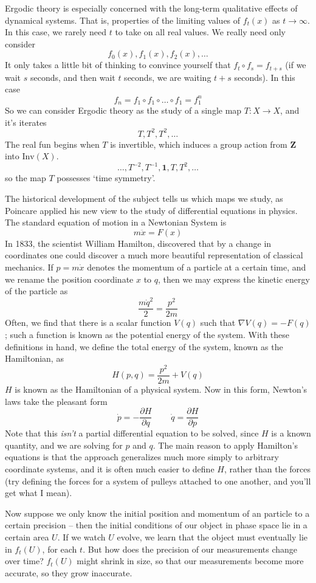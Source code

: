 Ergodic theory is especially concerned with the long-term qualitative effects of dynamical systems. That is, properties of the limiting values of $f_t(x)$ as $t \to \infty$. In this case, we rarely need $t$ to take on all real values. We really need only consider
%
\[ f_0(x), f_1(x), f_2(x), \dots \]
%
It only takes a little bit of thinking to convince yourself that $f_t \circ f_s = f_{t+s}$ (if we wait $s$ seconds, and then wait $t$ seconds, we are waiting $t + s$ seconds). In this case
%
\[ f_n = f_1 \circ f_1 \circ \dots \circ f_1 = f_1^n \]
%
So we can consider Ergodic theory as the study of a single map $T:X \to X$, and it's iterates
%
\[ T, T^2, T^2, \dots \]
%
The real fun begins when $T$ is invertible, which induces a group action from $\mathbf{Z}$ into $\text{Inv}(X)$.
%
\[ \dots, T^{-2}, T^{-1}, \mathbf{1}, T, T^2, \dots \]
%
so the map $T$ possesses `time symmetry'.

The historical development of the subject tells us which maps we study, as Poincare applied his new view to the study of differential equations in physics. The standard equation of motion in a Newtonian System is
%
\[ m \ddot{x} = F(x) \]
%
In 1833, the scientist William Hamilton, discovered that by a change in coordinates one could discover a much more beautiful representation of classical mechanics. If $p = m \dot{x}$ denotes the momentum of a particle at a certain time, and we rename the position coordinate $x$ to $q$, then we may express the kinetic energy of the particle as
%
\[ \frac{m\dot{q}^2}{2} = \frac{p^2}{2m} \]
%
Often, we find that there is a scalar function $V(q)$ such that $\nabla V(q) = - F(q)$; such a function is known as the potential energy of the system. With these definitions in hand, we define the total energy of the system, known as the Hamiltonian, as
%
\[ H(p,q) = \frac{p^2}{2m} + V(q) \]
%
$H$ is known as the Hamiltonian of a physical system. Now in this form, Newton's laws take the pleasant form
%
\[ \dot{p} = - \frac{\partial H}{\partial q}\ \ \ \ \ \ \ \ \ \ \dot{q} = \frac{\partial H}{\partial p} \]
%
Note that this {\it isn't} a partial differential equation to be solved, since $H$ is a known quantity, and we are solving for $p$ and $q$. The main reason to apply Hamilton's equations is that the approach generalizes much more simply to arbitrary coordinate systems, and it is often much easier to define $H$, rather than the forces (try defining the forces for a system of pulleys attached to one another, and you'll get what I mean).

Now suppose we only know the initial position and momentum of an particle to a certain precision -- then the initial conditions of our object in phase space lie in a certain area $U$. If we watch $U$ evolve, we learn that the object must eventually lie in $f_t(U)$, for each $t$. But how does the precision of our measurements change over time? $f_t(U)$ might shrink in size, so that our measurements become more accurate, so they grow inaccurate.

